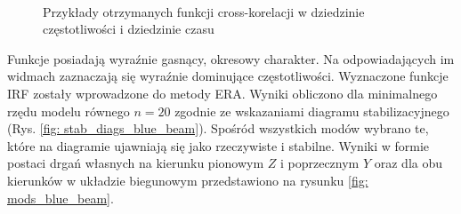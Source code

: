 \begin{figure}[H]
	\centering
	\\
	\captionsetup{justification=centering}
	\caption{Przykłady otrzymanych funkcji cross-korelacji w dziedzinie częstotliwości i dziedzinie czasu}
	\label{fig: cross_corr_blue_beam}
\end{figure}
Funkcje posiadają wyraźnie gasnący, okresowy charakter. Na odpowiadających im widmach zaznaczają się wyraźnie dominujące częstotliwości. Wyznaczone funkcje IRF zostały wprowadzone do metody ERA. Wyniki obliczono dla minimalnego rzędu modelu równego $n=20$ zgodnie ze wskazaniami diagramu stabilizacyjnego (Rys. \ref{fig: stab_diags_blue_beam}). Spośród wszystkich modów wybrano te, które na diagramie ujawniają się jako rzeczywiste i stabilne. Wyniki w formie postaci drgań własnych na kierunku pionowym $Z$ i poprzecznym $Y$ oraz dla obu kierunków w układzie biegunowym przedstawiono na rysunku \ref{fig: mods_blue_beam}. 

